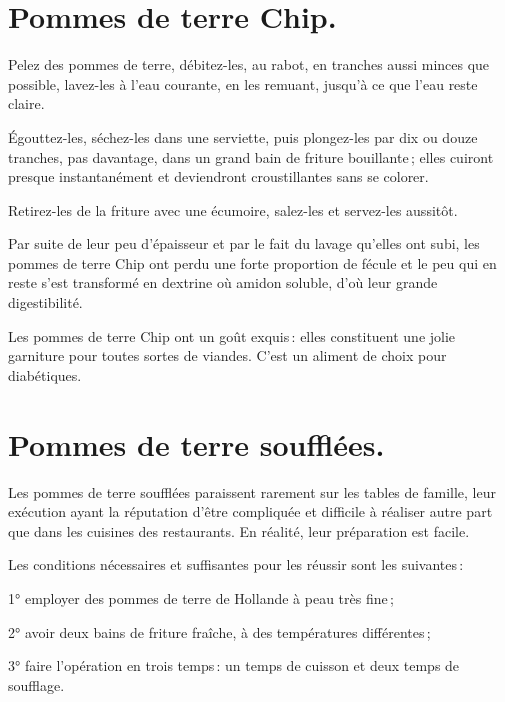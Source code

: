 \section*{\centering Pommes de terre Chip.}
{}
\label{pg0715-2} \hypertarget{p0715-2}{}

Pelez des pommes de terre, débitez-les, au rabot, en tranches aussi minces que
possible, lavez-les à l'eau courante, en les remuant, jusqu'à ce que l'eau
reste claire.

Égouttez-les, séchez-les dans une serviette, puis plongez-les par dix ou douze
tranches, pas davantage, dans un grand bain de friture bouillante ; elles cuiront
presque instantanément et deviendront croustillantes sans se colorer.

Retirez-les de la friture avec une écumoire, salez-les et servez-les aussitôt.

Par suite de leur peu d'épaisseur et par le fait du lavage qu'elles ont subi,
les pommes de terre Chip ont perdu une forte proportion de fécule et le peu qui
en reste s'est transformé en dextrine où amidon soluble, d'où leur grande
digestibilité.

\medskip

Les pommes de terre Chip ont un goût exquis : elles constituent une jolie
garniture pour toutes sortes de viandes. C'est un aliment de choix pour
diabétiques.

\section*{\centering Pommes de terre soufflées.}
{}
\label{pg0715} \hypertarget{p0715}{}

Les pommes de terre soufflées paraissent rarement sur les tables de famille,
leur exécution ayant la réputation d'être compliquée et difficile à réaliser
autre part que dans les cuisines des restaurants. En réalité, leur préparation
est facile.

Les conditions nécessaires et suffisantes pour les réussir sont les suivantes :

1° employer des pommes de terre de Hollande à peau très fine ;

2° avoir deux bains de friture fraîche, à des températures différentes ;

3° faire l'opération en trois temps : un temps de cuisson et deux temps de
soufflage.

